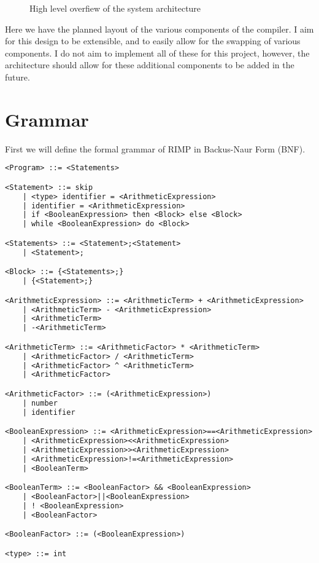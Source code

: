 \begin{center}
\begin{figure}[hbt!]
\caption{High level overfiew of the system architecture}
\label{fig:system_architecture}
\end{figure}
\end{center}

Here we have the planned layout of the various components of the compiler.
I aim for this design to be extensible, and to easily allow for the swapping of various components.
I do not aim to implement all of these for this project, however, the architecture should allow for these additional components to be added in the future.

\section*{Grammar}
First we will define the formal grammar of RIMP in Backus-Naur Form (BNF).

\begin{lstlisting}[language=TeX,label={lst:grammar}]
<Program> ::= <Statements>

<Statement> ::= skip
    | <type> identifier = <ArithmeticExpression>
    | identifier = <ArithmeticExpression>
    | if <BooleanExpression> then <Block> else <Block>
    | while <BooleanExpression> do <Block>

<Statements> ::= <Statement>;<Statement>
    | <Statement>;

<Block> ::= {<Statements>;}
    | {<Statement>;}

<ArithmeticExpression> ::= <ArithmeticTerm> + <ArithmeticExpression>
    | <ArithmeticTerm> - <ArithmeticExpression>
    | <ArithmeticTerm>
    | -<ArithmeticTerm>

<ArithmeticTerm> ::= <ArithmeticFactor> * <ArithmeticTerm>
    | <ArithmeticFactor> / <ArithmeticTerm>
    | <ArithmeticFactor> ^ <ArithmeticTerm>
    | <ArithmeticFactor>

<ArithmeticFactor> ::= (<ArithmeticExpression>)
    | number
    | identifier

<BooleanExpression> ::= <ArithmeticExpression>==<ArithmeticExpression>
    | <ArithmeticExpression><<ArithmeticExpression>
    | <ArithmeticExpression>><ArithmeticExpression>
    | <ArithmeticExpression>!=<ArithmeticExpression>
    | <BooleanTerm>

<BooleanTerm> ::= <BooleanFactor> && <BooleanExpression>
    | <BooleanFactor>||<BooleanExpression>
    | ! <BooleanExpression>
    | <BooleanFactor>

<BooleanFactor> ::= (<BooleanExpression>)

<type> ::= int
\end{lstlisting}

